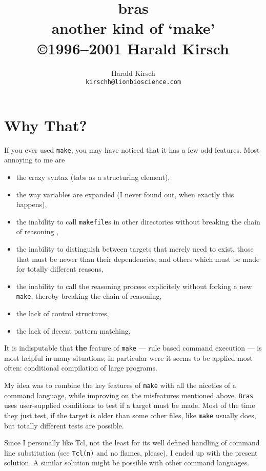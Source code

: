 \documentclass[11pt]{scrartcl}
\title{bras\\
another kind of `make'\\[2mm]
\small \copyright 1996--2001 Harald Kirsch}
\author{\relax
Harald Kirsch\\
\texttt{kirschh@lionbioscience.com}}
\newcommand{\Bras}{\texttt{Bras}}
\newcommand{\make}{\texttt{make}}
\newcommand{\makefile}{\texttt{makefile}}
\begin{document}
\maketitle

\tableofcontents
\clearpage


\section{Why That?}
If you ever used \texttt{make}, you may have noticed that it has a few
odd features. Most annoying to me are

\begin{itemize}
\item 
the crazy syntax (tabs as a structuring element),
\item 
the way variables are expanded (I never found out, when exactly
this happens),
\item 
the inability to call \makefile{}s in other directories without
breaking the chain of reasoning \cite{Mil97},
\item the inability to distinguish between targets that merely need to
  exist, those that must be newer than their dependencies, and others
  which must be made for totally different reasons,
\item the inability to call the reasoning process explicitely without
  forking a new \make, thereby breaking the chain of reasoning,
\item the lack of control structures,
\item the lack of decent pattern matching.
\end{itemize}

It is indisputable that \textbf{the} feature of \texttt{make} ---
rule based command execution --- is most helpful in many situations;
in particular were it seems to be applied most often:
conditional compilation of large programs.

My idea was to combine the key features of \texttt{make} with all the
niceties of a command language, while improving on the misfeatures
mentioned above. \Bras{} uses user-supplied conditions to test if a
target must be made. Most of the time they just test, if the target is
older than some other files, like \make{} usually does, but totally
different tests are possible.

Since I personally like Tcl, not the least for its well defined
handling of command line substitution (see \texttt{Tcl(n)} and no
flames, please), I ended up with the present solution. A similar
solution might be possible with other command languages.
\end{document}
